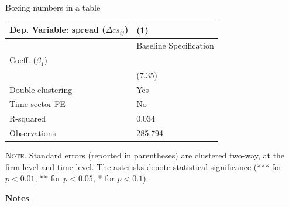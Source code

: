 \documentclass[10pt]{beamer}
\begin{document}
\begin{frame}
    {Boxing numbers in a table}
    \begin{table}[th]
        \centering%
        \begin{minipage}[b]{.6\textwidth}
            \vspace{.2cm}\tablesize
            \begin{tabularx}{\textwidth}{lY}
                \toprule
                Dep. Variable: spread ($\Delta cs_{ij}$) 	& (1)\\
                \midrule
                & {Baseline Specification} \\
                \midrule
                 Coeff. ($\beta_1$) 		&  {} \\
                &   (7.35) \\
                \midrule
                 Double clustering 		& Yes \\
                Time-sector FE 												& No \\
                 R-squared 					& 0.034 \\
                Observations 												& 285,794 \\\bottomrule
            \end{tabularx}\vspace{.2cm}\newline
            \tiny{{\scshape Note.} Standard errors (reported in parentheses) are clustered two-way, at the firm level and time level. The asterisks denote statistical significance (*** for $p<0.01$, ** for $p<0.05$, * for $p<0.1$).\newline}%
            \label{tab:label}%
        \end{minipage}
    \end{table}
\end{frame}
\begin{flushleft}
    \underline{\textbf{Notes}}\setlength{\parskip}{.15cm}\notesize\newline\par
\end{flushleft}
\end{document}
